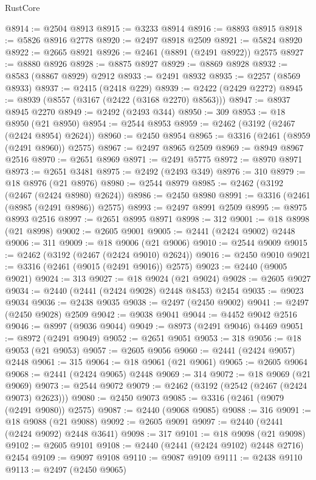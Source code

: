 \begin{lexlean}{RustCore}
\begin{coremodule}
@8914 := @2504 @8913
@8915 := @3233 @8914
@8916 := @8893 @8915
@8918 := @5826 @8916 @2778
@8920 := @2497 @8918 @2509
@8921 := @5824 @8920
@8922 := @2665 @8921
@8926 := @2461 (@8891 (@2491 @8922)) @2575
@8927 := @8880 @8926
@8928 := @8875 @8927
@8929 := @8869 @8928
@8932 := @8583 (@8867 @8929) @2912
@8933 := @2491 @8932
@8935 := @2257 (@8569 @8933)
@8937 := @2415 (@2418 @229)
@8939 := @2422 (@2429 @2272)
@8945 := @8939 (@8557 (@3167 (@2422 (@3168 @2270) @8563)))
@8947 := @8937 @8945 @2270
@8949 := @2492 (@2493 @344)
@8950 := 309
@8953 := @18 @8950 (@21 @8950)
@8954 := @2544 @8953
@8959 := @2462 (@3192 (@2467 (@2424 @8954) @2624))
@8960 := @2450 @8954
@8965 := @3316 (@2461 (@8959 (@2491 @8960)) @2575)
@8967 := @2497 @8965 @2509
@8969 := @8949 @8967 @2516
@8970 := @2651 @8969
@8971 := @2491 @5775
@8972 := @8970 @8971
@8973 := @2651 @3481
@8975 := @2492 (@2493 @349)
@8976 := 310
@8979 := @18 @8976 (@21 @8976)
@8980 := @2544 @8979
@8985 := @2462 (@3192 (@2467 (@2424 @8980) @2624))
@8986 := @2450 @8980
@8991 := @3316 (@2461 (@8985 (@2491 @8986)) @2575)
@8993 := @2497 @8991 @2509
@8995 := @8975 @8993 @2516
@8997 := @2651 @8995 @8971
@8998 := 312
@9001 := @18 @8998 (@21 @8998)
@9002 := @2605 @9001
@9005 := @2441 (@2424 @9002) @2448
@9006 := 311
@9009 := @18 @9006 (@21 @9006)
@9010 := @2544 @9009
@9015 := @2462 (@3192 (@2467 (@2424 @9010) @2624))
@9016 := @2450 @9010
@9021 := @3316 (@2461 (@9015 (@2491 @9016)) @2575)
@9023 := @2440 (@9005 @9021)
@9024 := 313
@9027 := @18 @9024 (@21 @9024)
@9028 := @2605 @9027
@9034 := @2440 (@2441 (@2424 @9028) @2448 @8453) @2454
@9035 := @9023 @9034
@9036 := @2438 @9035
@9038 := @2497 (@2450 @9002)
@9041 := @2497 (@2450 @9028) @2509
@9042 := @9038 @9041
@9044 := @4452 @9042 @2516
@9046 := @8997 (@9036 @9044)
@9049 := @8973 (@2491 @9046) @4469
@9051 := @8972 (@2491 @9049)
@9052 := @2651 @9051
@9053 := 318
@9056 := @18 @9053 (@21 @9053)
@9057 := @2605 @9056
@9060 := @2441 (@2424 @9057) @2448
@9061 := 315
@9064 := @18 @9061 (@21 @9061)
@9065 := @2605 @9064
@9068 := @2441 (@2424 @9065) @2448
@9069 := 314
@9072 := @18 @9069 (@21 @9069)
@9073 := @2544 @9072
@9079 := @2462 (@3192 (@2542 (@2467 (@2424 @9073) @2623)))
@9080 := @2450 @9073
@9085 := @3316 (@2461 (@9079 (@2491 @9080)) @2575)
@9087 := @2440 (@9068 @9085)
@9088 := 316
@9091 := @18 @9088 (@21 @9088)
@9092 := @2605 @9091
@9097 := @2440 (@2441 (@2424 @9092) @2448 @3641)
@9098 := 317
@9101 := @18 @9098 (@21 @9098)
@9102 := @2605 @9101
@9108 := @2440 (@2441 (@2424 @9102) @2448 @2716) @2454
@9109 := @9097 @9108
@9110 := @9087 @9109
@9111 := @2438 @9110
@9113 := @2497 (@2450 @9065)

\end{coremodule}
\end{lexlean}

